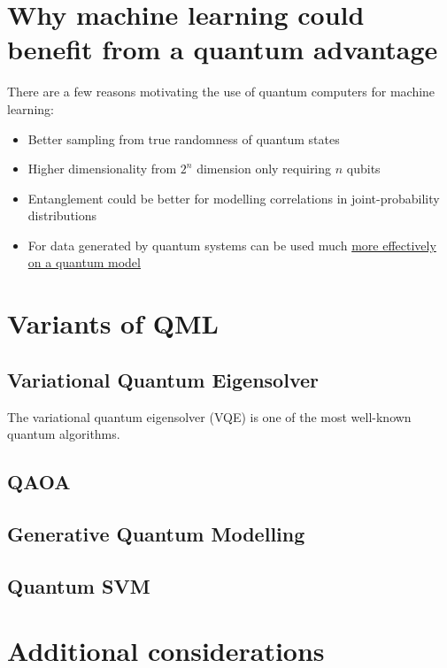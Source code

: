 \section{Why machine learning could benefit from a quantum advantage}

There are a few reasons motivating the use of quantum computers for machine learning:
\begin{itemize}
    \item Better sampling from true randomness of quantum states
    \item Higher dimensionality from $2^n$ dimension only requiring $n$ qubits
    \item Entanglement could be better for modelling correlations in joint-probability distributions
    \item For data generated by quantum systems can be used much \href{https://www.science.org/doi/10.1126/science.abn7293}{more effectively on a quantum model}
\end{itemize}

\section{Variants of QML} 

\subsection{Variational Quantum Eigensolver}

The variational quantum eigensolver (VQE) is one of the most well-known quantum algorithms. 

\subsection{QAOA}

\subsection{Generative Quantum Modelling}

\subsection{Quantum SVM} 

\section{Additional considerations}

